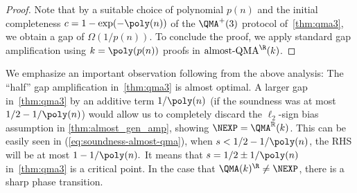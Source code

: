 \begin{proof}
Note that by a suitable choice of polynomial $p(n)$ and  the initial completeness $c=1-\exp(-\poly(n))$ of the $\QMA^+(3)$ protocol of~\cref{thm:qma3},
we obtain a gap of $\Omega(1/p(n))$. To conclude the proof, we apply standard gap amplification using $k=\poly(p(n))$ proofs in $\textup{almost-QMA}^\R(k)$.
\end{proof}

We emphasize an important observation following from the above analysis: The ``half'' gap amplification in~\cref{thm:qma3} is almost optimal. A larger gap in~\cref{thm:qma3} by an additive term $1/\poly(n)$ (\eg if the soundness was at most $1/2-1/\poly(n)$) would allow us to completely discard the $\ell_2$-sign bias assumption in \cref{thm:almost_gen_amp}, showing $\NEXP=\QMA^{\mathbb{R}}(k)$. This can be easily seen in (\ref{eq:soundness-almost-qma}), when $s<1/2-1/\poly(n)$, the RHS will be at most $1-1/\poly(n).$ It means that $s=1/2\pm 1/\poly(n)$ in~\cref{thm:qma3} is a critical point. In the case that $\QMA(k)^\R\not=\NEXP$, there is a sharp phase transition.
